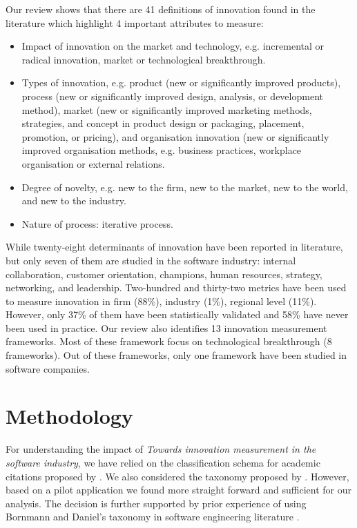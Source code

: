 \documentclass[sigplan]{acmart}
\newcommand{\theArticle}{\textit{Towards innovation measurement in the software industry}}
\begin{document}
Our review shows that there are 41 definitions of innovation found in the literature which highlight 4 important attributes to measure: 
\begin{itemize}
	\item Impact of innovation on the market and technology, e.g. incremental or radical innovation, market or technological breakthrough.
	\item Types of innovation, e.g. product (new or significantly improved products), process (new or significantly improved design, analysis, or development method), market (new or significantly improved marketing methods, strategies, and concept in product design or packaging, placement, promotion, or pricing), and organisation innovation (new or significantly improved organisation methods, e.g. business practices, workplace organisation or external relations.
	\item Degree of novelty, e.g. new to the firm, new to the market, new to the world, and new to the industry.
	\item Nature of process: iterative process.
\end{itemize}

While twenty-eight determinants of innovation have been reported in literature, but only seven of them are studied in the software industry: internal collaboration, customer orientation, champions, human resources, strategy, networking, and leadership. Two-hundred and thirty-two metrics have been used to measure innovation in firm (88\%), industry (1\%), regional level (11\%). However, only 37\% of them have been statistically validated and 58\% have never been used in practice. Our review also identifies 13 innovation measurement frameworks. Most of these framework focus on technological breakthrough (8 frameworks). Out of these frameworks, only one framework have been studied in software companies.

\section{Methodology}
For understanding the impact of \theArticle, we have relied on the classification schema for academic citations proposed by \citet{teufel2006annotation}. We also considered the taxonomy proposed by \citet{bornmann2008citation}. However, based on a pilot application we found \citet{teufel2006annotation} more straight forward and sufficient for our analysis. The decision is further supported by prior experience of using Bornmann and Daniel's taxonomy in software engineering literature \cite{poulding2015using}.
\end{document}
